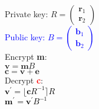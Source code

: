 \begin{frame}
	\textcolor{gray!80}{Private key:} 
	\textcolor{gray!80}{%
		$R =
		\begin{pmatrix}
			\mathbf{r}_1 \\[0.3em] 
			\mathbf{r}_2
		\end{pmatrix}$
	}
	\\
	\textcolor{blue}{Public key:}
	\textcolor{blue}{%
		$B = \begin{pmatrix}
			\mathbf{b}_1 \\[0.3em] 
			\mathbf{b}_2
		\end{pmatrix}$
	}
	\\
	\textcolor{gray!80}{Encrypt \textbf{m}:\\}
	\hspace{1.0em} \textcolor{gray!80}{$\mathbf{v} = \mathbf{m}B$}\\
	\hspace{1.0em} \textcolor{gray!80}{$\mathbf{c} = \mathbf{v} + \mathbf{e}$}\\
	
	\textcolor{black!80}{Decrypt \textcolor{red}{\textbf{c}}:\\}
	\hspace{1.0em} \textcolor{black}{$\mathbf{v^{\prime}} = \lfloor\mathbf{c}R^{-1}\rceil  R$}\\
	\hspace{1.0em} \textcolor{black}{$\mathbf{m^{\prime}} = \mathbf{v^{\prime}}B^{-1}$}
	
\end{frame}